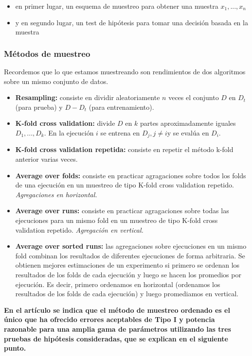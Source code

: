 \documentclass[11pt]{article}
\providecommand{\tightlist}{%
      \setlength{\itemsep}{0pt}\setlength{\parskip}{0pt}}
\begin{document}
\begin{itemize}
\tightlist
\item
  en primer lugar, un esquema de muestreo para obtener una muestra
  \(x_1,... ,x_n\)
\item
  y en segundo lugar, un test de hipótesis para tomar una decisión
  basada en la muestra
\end{itemize}

\subsubsection{Métodos de muestreo}\label{muxe9todos-de-muestreo}

Recordemos que lo que estamos muestreando son rendimientos de dos
algoritmos sobre un mismo conjunto de datos.

\begin{itemize}
\item
  \textbf{Resampling:} consiste en dividir aleatoriamente \(n\) veces el
  conjunto \(D\) en \(D_t\) (para prueba) y \(D-D_t\) (para
  entrenamiento).
\item
  \textbf{K-fold cross validation:} divide \(D\) en \(k\) partes
  aproximadamente iguales \(D_1,...,D_k\). En la ejecución \(i\) se
  entrena en \(D_j, j\ne i\)y se evalúa en \(D_i\).
\item
  \textbf{K-fold cross validation repetida:} consiste en repetir el
  método k-fold anterior varias veces.
\item
  \textbf{Average over folds:} consiste en practicar agragaciones sobre
  todos los folds de una ejecución en un muestreo de tipo K-fold cross
  validation repetido. \emph{Agregaciones en horizontal.}
\item
  \textbf{Average over runs:} consiste en practicar agragaciones sobre
  todas las ejecuciones para un mismo fold en un muestreo de tipo K-fold
  cross validation repetido. \emph{Agregación en vertical.}
\item
  \textbf{Average over sorted runs:} las agregaciones sobre ejecuciones
  en un mismo fold combinan los resultados de diferentes ejecuciones de
  forma arbitraria. Se obtienen mejores estimaciones de un experimento
  si primero se ordenan los resultados de los folds de cada ejecución y
  luego se hacen los promedios por ejecución. Es decir, primero
  ordenamos en horizontal (ordenamos los resultados de los folds de cada
  ejecución) y luego promediamos en vertical.
\end{itemize}

\textbf{En el artículo se indica que el método de muestreo ordenado es
el único que ha ofrecido errores aceptables de Tipo I y potencia
razonable para una amplia gama de parámetros utilizando las tres pruebas
de hipótesis consideradas, que se explican en el siguiente punto.}
\end{document}
